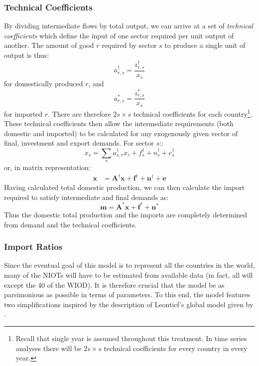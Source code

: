 \documentclass[a4paper]{article}
\begin{document}
\subsubsection*{Technical Coefficients}\label{sec:techcoeffs}
By dividing intermediate flows by total output, we can arrive at a set of \textit{technical coefficients} which define the input of one sector required per unit output of another.
The amount of good $r$ required by sector $s$ to produce a single unit of output is thus:
\begin{equation}\label{eq:adagger}
a_{r,s}^\dagger = \frac{z^\dagger_{r,s}}{x_s}
\end{equation}
for domestically produced $r$, and
\begin{equation}\label{eq:astar}
a_{r,s}^* = \frac{z^*_{r,s}}{x_s}
\end{equation}
for imported $r$. There are therefore $2s \times s$ technical coefficients for each country\footnote{Recall that single year is assumed throughout this treatment.
In time series analyses there will be $2s \times s$ technical coefficients for every country in every year.}.
These technical coefficients then allow the intermediate requirements (both domestic and imported) to be calculated for any exogenously given vector of final, investment and export demands. For sector $s$::
$$
x_s = \sum_r{a^\dagger_{s,r}x_r} + f^\dagger_s + n^\dagger_s + e^\dagger_s 
$$
or, in matrix representation:
\begin{align}
\boldsymbol{x}& = 
\boldsymbol{A^\dagger}\boldsymbol{x}
+ 
\boldsymbol{f^\dagger} + \boldsymbol{n^\dagger} + \boldsymbol{e} 
\label{eqn:xIRIO}
\end{align}
Having calculated total domestic production, we can then calculate the import required to satisfy intermediate and final demands as:
\begin{equation}\label{eqn:mIRIO}
\boldsymbol{m}
=
\boldsymbol{A^*}\boldsymbol{x}
+
\boldsymbol{f^*} + \boldsymbol{n^*} 
\end{equation}
Thus the domestic total production and the imports are completely determined from demand and the technical coefficients.

\subsubsection*{Import Ratios}\label{sec:importratios}
Since the eventual goal of this model is to represent all the countries in the world, many of the NIOTs will have to be estimated from available data (in fact, all will except the 40 of the WIOD).
It is therefore crucial that the model be as parsimonious as possible in terms of parameters.
To this end, the model features two simplifications inspired by the description of Leontief's global model given by \textcite{Duchin2004}.
\end{document}
